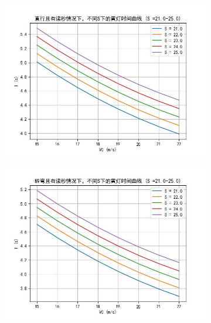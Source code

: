 \documentclass[withoutpreface,bwprint]{cumcmthesis}
\begin{document}
	\begin{figure}[htbp!]
	\centering
	\begin{subfigure}[t]{0.45\textwidth}
		\centering
		\includegraphics[width=\textwidth]{pics/Time_Curve_S_WCT_STR25.00}
		\label{fig:str1}
	\end{subfigure}
	\hfill
	\begin{subfigure}[t]{0.45\textwidth}
		\centering
		\includegraphics[width=\textwidth]{pics/Time_Curve_S_WCT_Turn25.00}
		\label{fig:turn1}
	\end{subfigure}
	\\
	\begin{subfigure}[t]{0.45\textwidth}

\end{subfigure}
\end{figure}
\end{document}
